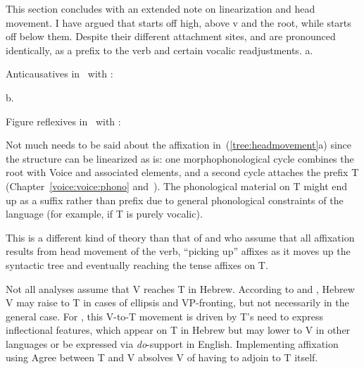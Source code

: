 This section concludes with an extended note on linearization and head movement. I have argued that {\vz} starts off high, above v and the root, while {\pz} starts off below them. Despite their different attachment sites, {\vz} and {\pz} are pronounced identically, as a prefix to the verb and certain vocalic readjustments.
\ex\label{tree:headmovement}
a. \begin{minipage}[t]{0.4\textwidth}
	Anticausatives in \tnif~with \vz:\\
\end{minipage}
\begin{minipage}[t]{0.01\textwidth}
	\phantom{x}
\end{minipage}
b. \begin{minipage}[t]{0.45\textwidth}
	Figure reflexives in \tnif~with \pz:\\
\end{minipage}
\xe
Not much needs to be said about the affixation in~(\ref{tree:headmovement}a) since the structure can be linearized as is: one morphophonological cycle combines the root with Voice and associated elements, and a second cycle attaches the prefix T (Chapter~\ref{voice:voice:phono} and~\citealt{kastner18nllt}). The phonological material on T might end up as a suffix rather than prefix due to general phonological constraints of the language (for example, if T is purely vocalic).

This is a different kind of theory than that of \cite{shlonsky89} and \cite{ritter95} who assume that all affixation results from head movement of the verb, ``picking up'' affixes as it moves up the syntactic tree \citep{pollock89} and eventually reaching the tense affixes on T.

Not all analyses assume that V reaches T in Hebrew. According to \cite{borer95} and \cite{landau06}, Hebrew V may raise to T in cases of ellipsis and VP-fronting, but not necessarily in the general case. For \citeauthor{landau06}, this V-to-T movement is driven by T's need to express inflectional features, which appear on T in Hebrew but may lower to V in other languages or be expressed via \emph{do}-support in English. Implementing affixation using Agree between T and V absolves V of having to adjoin to T itself.

